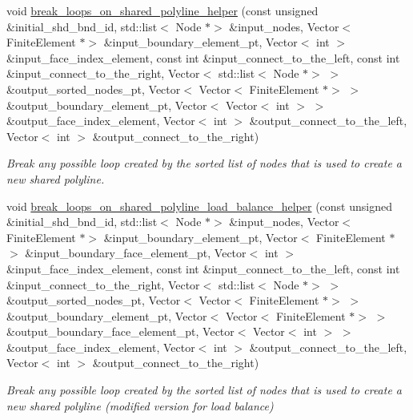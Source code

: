 \begin{DoxyCompactItemize}
void \hyperlink{classoomph_1_1TriangleMesh_a191f27cfdca85947cb9391f6d593723f}{break\+\_\+loops\+\_\+on\+\_\+shared\+\_\+polyline\+\_\+helper} (const unsigned \&initial\+\_\+shd\+\_\+bnd\+\_\+id, std\+::list$<$ Node $\ast$$>$ \&input\+\_\+nodes, Vector$<$ Finite\+Element $\ast$$>$ \&input\+\_\+boundary\+\_\+element\+\_\+pt, Vector$<$ int $>$ \&input\+\_\+face\+\_\+index\+\_\+element, const int \&input\+\_\+connect\+\_\+to\+\_\+the\+\_\+left, const int \&input\+\_\+connect\+\_\+to\+\_\+the\+\_\+right, Vector$<$ std\+::list$<$ Node $\ast$$>$ $>$ \&output\+\_\+sorted\+\_\+nodes\+\_\+pt, Vector$<$ Vector$<$ Finite\+Element $\ast$$>$ $>$ \&output\+\_\+boundary\+\_\+element\+\_\+pt, Vector$<$ Vector$<$ int $>$ $>$ \&output\+\_\+face\+\_\+index\+\_\+element, Vector$<$ int $>$ \&output\+\_\+connect\+\_\+to\+\_\+the\+\_\+left, Vector$<$ int $>$ \&output\+\_\+connect\+\_\+to\+\_\+the\+\_\+right)
\begin{DoxyCompactList}\small\item\em Break any possible loop created by the sorted list of nodes that is used to create a new shared polyline. \end{DoxyCompactList}\item 
void \hyperlink{classoomph_1_1TriangleMesh_a7a11910db7d631b7949d2342e2573304}{break\+\_\+loops\+\_\+on\+\_\+shared\+\_\+polyline\+\_\+load\+\_\+balance\+\_\+helper} (const unsigned \&initial\+\_\+shd\+\_\+bnd\+\_\+id, std\+::list$<$ Node $\ast$$>$ \&input\+\_\+nodes, Vector$<$ Finite\+Element $\ast$$>$ \&input\+\_\+boundary\+\_\+element\+\_\+pt, Vector$<$ Finite\+Element $\ast$$>$ \&input\+\_\+boundary\+\_\+face\+\_\+element\+\_\+pt, Vector$<$ int $>$ \&input\+\_\+face\+\_\+index\+\_\+element, const int \&input\+\_\+connect\+\_\+to\+\_\+the\+\_\+left, const int \&input\+\_\+connect\+\_\+to\+\_\+the\+\_\+right, Vector$<$ std\+::list$<$ Node $\ast$$>$ $>$ \&output\+\_\+sorted\+\_\+nodes\+\_\+pt, Vector$<$ Vector$<$ Finite\+Element $\ast$$>$ $>$ \&output\+\_\+boundary\+\_\+element\+\_\+pt, Vector$<$ Vector$<$ Finite\+Element $\ast$$>$ $>$ \&output\+\_\+boundary\+\_\+face\+\_\+element\+\_\+pt, Vector$<$ Vector$<$ int $>$ $>$ \&output\+\_\+face\+\_\+index\+\_\+element, Vector$<$ int $>$ \&output\+\_\+connect\+\_\+to\+\_\+the\+\_\+left, Vector$<$ int $>$ \&output\+\_\+connect\+\_\+to\+\_\+the\+\_\+right)
\begin{DoxyCompactList}\small\item\em Break any possible loop created by the sorted list of nodes that is used to create a new shared polyline (modified version for load balance) \end{DoxyCompactList}\item 

\end{DoxyCompactItemize}
